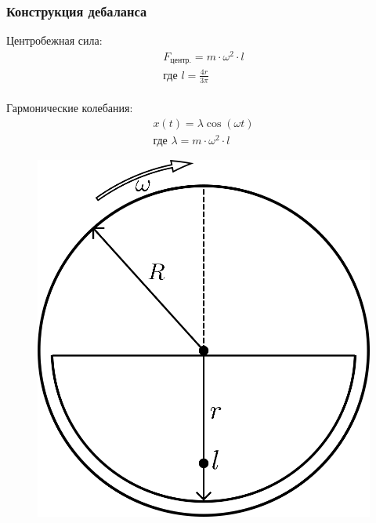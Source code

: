 \documentclass[10pt, pdf, hyperref={unicode}]{beamer}
\begin{document}
    \begin{frame}
        \frametitle{Конструкция дебаланса}
        \begin{center}
            \begin{minipage}[h]{0.97\linewidth}
                \begin{minipage}[h]{0.6\linewidth}
                    Центробежная сила:
                    \begin{equation}
                        \begin{gathered}
                            F_{\textrm{центр.}} = m \cdot \omega^2 \cdot l \\
                            \textrm{где } l = \frac{4 r}{3 \pi}
                        \end{gathered}
                    \end{equation}
                    \\
                    Гармонические колебания:
                    \begin{equation}
                        \begin{gathered}
                            x(t) = \lambda \cos (\omega t) \\
                            \textrm{где } \lambda = m \cdot \omega^2 \cdot l
                        \end{gathered}
                    \end{equation}
                \end{minipage}
                \hfill
                \begin{minipage}[h]{0.36\linewidth}
                    \begin{figure}[h]
                        \centering
                        \includegraphics[width=1\linewidth]{../img/debalance.png}

\end{figure}
\end{minipage}
\end{minipage}
\end{center}
\end{frame}
\end{document}
